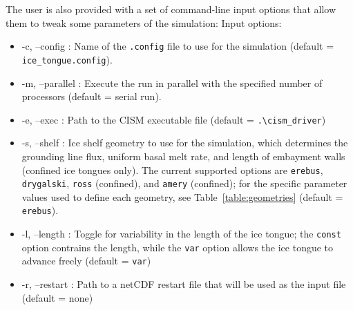 \documentclass{article}
\begin{document}
The user is also provided with a set of command-line input options that allow them to tweak some parameters of the simulation:
Input options:
\begin{itemize}
   \item -c, --config : Name of the \texttt{.config} file to use for the simulation (default = \texttt{ice\_tongue.config}).
   \item -m, --parallel : Execute the run in parallel with the specified number of processors (default = serial run).
   \item -e, --exec : Path to the CISM executable file (default = \texttt{.\textbackslash cism\_driver})
   \item -s, --shelf : Ice shelf geometry to use for the simulation, which determines the grounding line flux, uniform basal melt rate, and length of embayment walls (confined ice tongues only). The current supported options are \texttt{erebus}, \texttt{drygalski}, \texttt{ross} (confined), and \texttt{amery} (confined); for the specific parameter values used to define each geometry, see Table~\ref{table:geometries} (default = \texttt{erebus}).
   \item -l, --length : Toggle for variability in the length of the ice tongue; the \texttt{const} option contrains the length, while the \texttt{var} option allows the ice tongue to advance freely (default = \texttt{var})
   \item -r, --restart : Path to a netCDF restart file that will be used as the input file (default = none)
\end{itemize}
\end{document}
